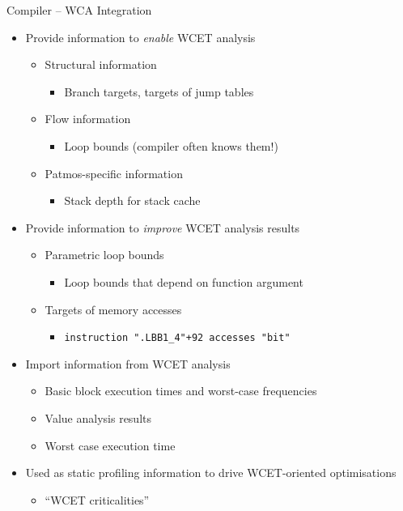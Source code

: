 \documentclass[17pt]{beamer}
\begin{document}
\begin{frame}[allowframebreaks]{Compiler -- WCA Integration}
  \begin{itemize}
  \item Provide information to \emph{enable} WCET analysis
    \begin{itemize}
    \item Structural information
      \begin{itemize}
      \item Branch targets, targets of jump tables
      \end{itemize}
    \item Flow information
      \begin{itemize}
      \item Loop bounds (compiler often knows them!)
      \end{itemize}
    \item Patmos-specific information
      \begin{itemize}
      \item Stack depth for stack cache
      \end{itemize}
    \end{itemize}
    \framebreak
  \item Provide information to \emph{improve} WCET analysis results
    \begin{itemize}
    \item Parametric loop bounds
      \begin{itemize}
      \item Loop bounds that depend on function argument
      \end{itemize}
    \item Targets of memory accesses
      \begin{itemize}
      \item \texttt{instruction ".LBB1\_4"+92 accesses "bit"}
      \end{itemize}
    \end{itemize}
    \framebreak
  \item Import information from WCET analysis
    \begin{itemize}
    \item Basic block execution times and worst-case frequencies
    \item Value analysis results
    \item Worst case execution time      
    \end{itemize}
  \item Used as static profiling information to drive WCET-oriented optimisations
    \begin{itemize}
    \item ``WCET criticalities''
    \end{itemize}
  \end{itemize}
\end{frame}
\end{document}

